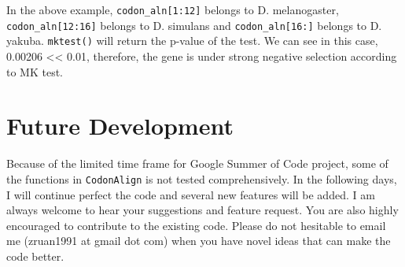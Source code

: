 In the above example, \texttt{codon\_aln{[}1:12{]}} belongs to
D. melanogaster, \texttt{codon\_aln{[}12:16{]}} belongs to D. simulans
and \texttt{codon\_aln{[}16:{]}} belongs to D. yakuba. \verb|mktest()|
will return the p-value of the test. We can see in this case, 0.00206
\textless{}\textless{} 0.01, therefore, the gene is under strong
negative selection according to MK test.

\section{Future Development}

Because of the limited time frame for Google Summer of Code project,
some of the functions in \verb|CodonAlign| is not tested
comprehensively. In the following days, I will continue perfect the code
and several new features will be added. I am always welcome to hear your
suggestions and feature request. You are also highly encouraged to
contribute to the existing code. Please do not hesitable to email me
(zruan1991 at gmail dot com) when you have novel ideas that can make the
code better.
